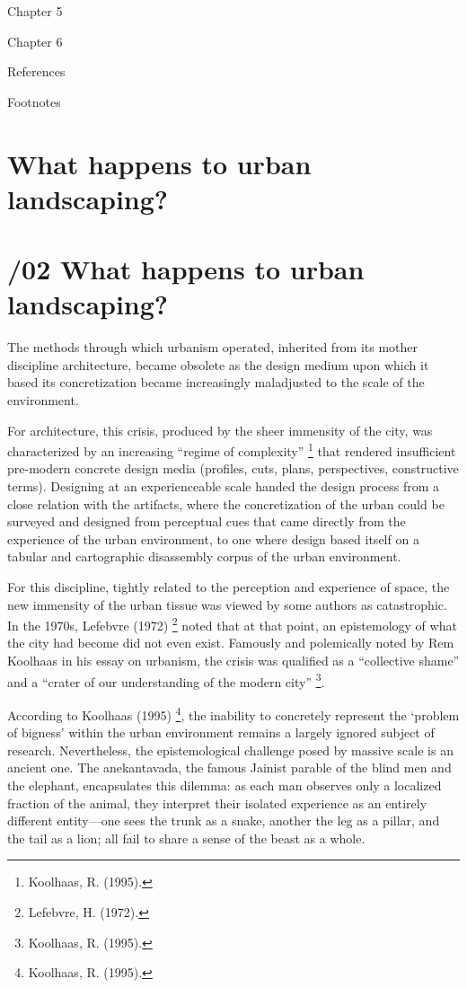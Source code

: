 \documentclass[
  letterpaper,
  DIV=11,
  numbers=noendperiod]{scrreprt}
\begin{document}
Chapter 5

Chapter 6

References

Footnotes


\chapter{What happens to urban
landscaping?}\label{what-happens-to-urban-landscaping}


\chapter{\texorpdfstring{{/02} What happens to urban
landscaping?}{/02 What happens to urban landscaping?}}\label{what-happens-to-urban-landscaping-1}

The methods through which urbanism operated, inherited from its mother
discipline architecture, became obsolete as the design medium upon which
it based its concretization became increasingly maladjusted to the scale
of the environment.

For architecture, this crisis, produced by the sheer immensity of the
city, was characterized by an increasing ``regime of complexity''
\footnote{Koolhaas, R. (1995).} that rendered insufficient pre-modern
concrete design media (profiles, cuts, plans, perspectives, constructive
terms). Designing at an experienceable scale handed the design process
from a close relation with the artifacts, where the concretization of
the urban could be surveyed and designed from perceptual cues that came
directly from the experience of the urban environment, to one where
design based itself on a tabular and cartographic disassembly corpus of
the urban environment.

For this discipline, tightly related to the perception and experience of
space, the new immensity of the urban tissue was viewed by some authors
as catastrophic. In the 1970s, Lefebvre (1972) \footnote{Lefebvre, H.
  (1972).} noted that at that point, an epistemology of what the city
had become did not even exist. Famously and polemically noted by Rem
Koolhaas in his essay on urbanism, the crisis was qualified as a
``collective shame'' and a ``crater of our understanding of the modern
city'' \footnote{Koolhaas, R. (1995).}.

According to Koolhaas (1995) \footnote{Koolhaas, R. (1995).}, the
inability to concretely represent the `problem of bigness' within the
urban environment remains a largely ignored subject of research.
Nevertheless, the epistemological challenge posed by massive scale is an
ancient one. The anekantavada, the famous Jainist parable of the blind
men and the elephant, encapsulates this dilemma: as each man observes
only a localized fraction of the animal, they interpret their isolated
experience as an entirely different entity---one sees the trunk as a
snake, another the leg as a pillar, and the tail as a lion; all fail to
share a sense of the beast as a whole.
\end{document}
